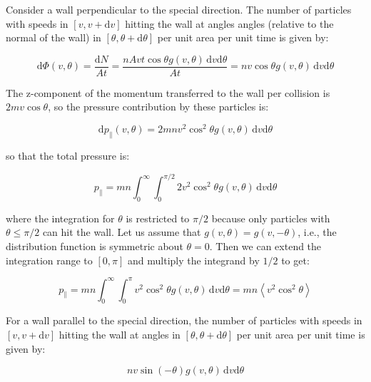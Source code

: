 \documentclass[12pt]{article}
\begin{document}
Consider a wall perpendicular to the special direction. The number of particles with speeds in $[v, v + \mathrm{d}v]$ hitting the wall at angles angles (relative to the normal of the wall) in $[\theta, \theta + \mathrm{d}\theta]$ per unit area per unit time is given by:

\begin{equation}
    \mathrm{d}\Phi(v, \theta) = \frac{\mathrm{d}N}{At} = \frac{nAvt \cos{\theta} g(v, \theta) \, \mathrm{d}v \mathrm{d}\theta}{At} = nv \cos{\theta} g(v, \theta) \, \mathrm{d}v \mathrm{d}\theta
\end{equation}

The z-component of the momentum transferred to the wall per collision is $2mv \cos{\theta}$, so the pressure contribution by these particles is:

\begin{equation}
    \mathrm{d}p_{\parallel}(v, \theta) = 2mnv^{2} \cos^{2}{\theta} g(v, \theta) \, \mathrm{d}v \mathrm{d}\theta
\end{equation}

so that the total pressure is:

\begin{equation}
    p_{\parallel} = mn \int_{0}^{\infty} \int_{0}^{\pi/2} 2v^{2} \cos^{2}{\theta} g(v, \theta) \, \mathrm{d}v \mathrm{d}\theta
\end{equation}

where the integration for $\theta$ is restricted to $\pi/2$ because only particles with $\theta \le \pi/2$ can hit the wall. Let us assume that $g(v, \theta) = g(v, -\theta)$, i.e., the distribution function is symmetric about $\theta = 0$. Then we can extend the integration range to $[0, \pi]$ and multiply the integrand by $1/2$ to get:

\begin{equation}
    p_{\parallel} = mn \int_{0}^{\infty} \int_{0}^{\pi} v^{2} \cos^{2}{\theta} g(v, \theta) \, \mathrm{d}v \mathrm{d}\theta = mn \left\langle v^{2} \cos^{2}{\theta} \right\rangle
\end{equation}

For a wall parallel to the special direction, the number of particles with speeds in $[v, v + \mathrm{d}v]$ hitting the wall at angles in $[\theta, \theta + \mathrm{d}\theta]$ per unit area per unit time is given by:

\begin{equation}
    nv \sin{(-\theta)} g(v, \theta) \, \mathrm{d}v \mathrm{d}\theta
\end{equation}
\end{document}

